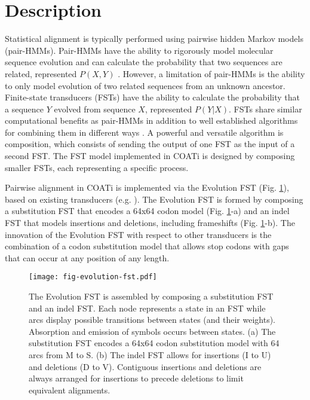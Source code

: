 \section{Description}

Statistical alignment is typically performed using pairwise hidden Markov
models (pair-HMMs).
Pair-HMMs have the ability to rigorously model molecular sequence evolution and
can calculate the probability that two sequences are related, represented
$P(X, Y)$ \parencite{yoon_2009_hmm}.
However, a limitation of pair-HMMs is the ability to only model evolution of two
related sequences from an unknown ancestor.
Finite-state transducers (FSTs) have the ability to calculate the probability
that a sequence $Y$ evolved from sequence $X$, represented $P(Y | X)$.
FSTs share similar computational benefits as pair-HMMs in addition to well
established algorithms for combining them in different ways
\parencite{bradley2007transducers}.
A powerful and versatile algorithm is composition, which consists of sending the
output of one FST as the input of a second FST.
The FST model implemented in COATi is designed by composing smaller FSTs, each
representing a specific process.

Pairwise alignment in COATi is implemented via the Evolution FST (Fig.
\ref{fig:evolution-fst}), based on existing transducers (e.g.
\cite{holmes2001evolutionary}).
The Evolution FST is formed by composing a substitution FST that encodes a 64x64
codon model (Fig. \ref{fig:evolution-fst}-a) and an indel FST that models
insertions and deletions, including frameshifts (Fig. \ref{fig:evolution-fst}-b).
The innovation of the Evolution FST with respect to other transducers is the
combination of a codon substitution model that allows stop codons with gaps that
can occur at any position of any length.

\begin{figure}[h!]
\begin{framed}
\centering
    \texttt{[image: fig-evolution-fst.pdf]}
    \caption{The Evolution FST is assembled by composing a substitution FST and
    an indel FST. Each node represents a state in an FST while arcs display
    possible transitions between states (and their weights). Absorption and
    emission of symbols occurs between states. (a) The substitution FST
    encodes a 64x64 codon substitution model with 64 arcs from M to S. (b)
    The indel FST allows for insertions (I to U) and deletions (D to V).
    Contiguous insertions and deletions are always arranged for insertions to
    precede deletions to limit equivalent alignments.}
    \label{fig:evolution-fst}
\end{framed}
\end{figure}



